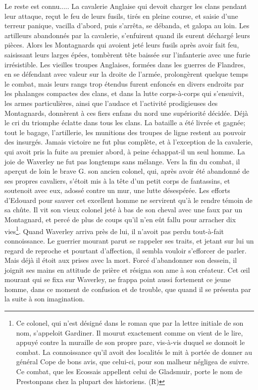 {Le reste est connu..... La cavalerie Anglaise qui devoit charger les clans pendant leur attaque, reçut le feu de leurs fusils, tirés en pleine course, et saisie d'une terreur panique, vacilla d'abord, puis s'arrêta, se débanda, et galopa au loin. Les artilleurs abandonnés par la cavalerie, s'enfuirent quand ils eurent déchargé leurs pièces. Alors les Montagnards qui avoient jeté leurs fusils après avoir fait feu, saisissant leurs larges épées, tombèrent tête baissée sur l'infanterie avec une furie irrésistible.
Les vieilles troupes Anglaises, formées dans les guerres de Flandres, en se défendant avec valeur sur la droite de l'armée, prolongèrent quelque temps le combat, mais leurs rangs trop étendus furent enfoncés en divers endroits par les phalanges compactes des clans, et dans la lutte corps-à-corps qui s'ensuivit, les armes particulières, ainsi que l'audace et l'activité prodigieuses des Montagnards, donnèrent à ces fiers enfans du nord une supériorité décidée.
Déjà le cri du triomphe éclatte dans tous\setcounter{page}{246} les clans. La bataille a été livrée et gagnée; tout le bagage, l'artillerie, les munitions des troupes de ligne restent au pouvoir des insurgés. Jamais victoire ne fut plus complète, et à l'exception de la cavalerie, qui avoit pris la fuite au premier abord, à peine échappat-il un seul homme.
La joie de Waverley ne fut pas longtemps sans mélange. Vers la fin du combat, il aperçut de loin le brave G. son ancien colonel, qui, après avoir été abandonné de ses propres cavaliers, s'étoit mis à la tête d'un petit corps de fantassins, et soutenoit avec eux, adossé contre un mur, une lutte désespérée. Les efforts d'Edouard pour sauver cet excellent homme ne servirent qu'à le rendre témoin de sa chûte. Il vit son vieux colonel jeté à bas de son cheval avec une faux par un Montagnard, et percé de plus de coups qu'il n'en eût fallu pour arracher dix vies\footnote{Ce colonel, qui n'est désigné dans le roman que par la lettre initiale de son nom, s'appeloit Gardiner. Il mourut exactement comme on vient de le lire, appuyé contre la muraille de son propre parc, vis-à-vis duquel se donnoit le combat. La connoissance qu'il avoit des localités le mit à portée de donner au général Cope de bons avis, que celui-ci, pour son malheur négligea de suivre. Ce combat, que les Ecossais appellent celui de Gladsmuir, porte le nom de Prestonpans chez la plupart des historiens. (R)}.\setcounter{page}{247} Quand Waverley arriva près de lui, il n'avoit pas perdu tout-à-fait connoissance. Le guerrier mourant parut se rappeler ses traits, et jetant sur lui un regard de reproche et pourtant d'affection, il sembla vouloir s'efforcer de parler. Mais déjà il étoit aux prises avec la mort. Forcé d'abandonner son dessein, il joignit ses mains en attitude de prière et résigna son ame à son créateur. Cet œil mourant qui se fixa sur Waverley, ne frappa point aussi fortement ce jeune homme, dans ce moment de confusion et de trouble, que quand il se présenta par la suite à son imagination.
}
